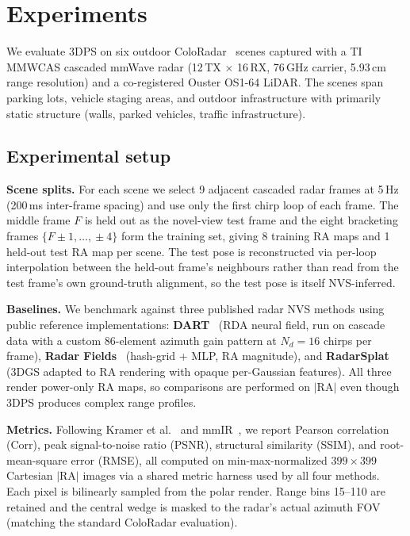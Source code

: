 \section{Experiments}
\label{sec:experiments}

We evaluate 3DPS on six outdoor ColoRadar~\cite{kramer2022coloradar} scenes captured with a TI MMWCAS cascaded mmWave radar (12\,TX $\times$ 16\,RX, 76\,GHz carrier, 5.93\,cm range resolution) and a co-registered Ouster OS1-64 LiDAR. The scenes span parking lots, vehicle staging areas, and outdoor infrastructure with primarily static structure (walls, parked vehicles, traffic infrastructure).

\subsection{Experimental setup}
\label{sec:experiments:setup}

\textbf{Scene splits.} For each scene we select 9 adjacent cascaded radar frames at 5\,Hz (200\,ms inter-frame spacing) and use only the first chirp loop of each frame. The middle frame $F$ is held out as the novel-view test frame and the eight bracketing frames $\{F\!\pm\!1,\ldots,\!\pm\!4\}$ form the training set, giving 8 training RA maps and 1 held-out test RA map per scene. The test pose is reconstructed via per-loop interpolation between the held-out frame's neighbours rather than read from the test frame's own ground-truth alignment, so the test pose is itself NVS-inferred.

\textbf{Baselines.} We benchmark against three published radar NVS methods using public reference implementations: \textbf{DART}~\cite{huang2024dart} (RDA neural field, run on cascade data with a custom 86-element azimuth gain pattern at $N_d{=}16$ chirps per frame), \textbf{Radar Fields}~\cite{10.1145/3641519.3657510} (hash-grid + MLP, RA magnitude), and \textbf{RadarSplat}~\cite{kung2025radarsplat} (3DGS adapted to RA rendering with opaque per-Gaussian features). All three render power-only RA maps, so comparisons are performed on $|\mathrm{RA}|$ even though 3DPS produces complex range profiles.

\textbf{Metrics.} Following Kramer et al.~\cite{kramer2022coloradar} and mmIR~\cite{mmIR2026}, we report Pearson correlation (Corr), peak signal-to-noise ratio (PSNR), structural similarity (SSIM), and root-mean-square error (RMSE), all computed on min-max-normalized $399\!\times\!399$ Cartesian $|\mathrm{RA}|$ images via a shared metric harness used by all four methods. Each pixel is bilinearly sampled from the polar render. Range bins 15--110 are retained and the central wedge is masked to the radar's actual azimuth FOV (matching the standard ColoRadar evaluation).

